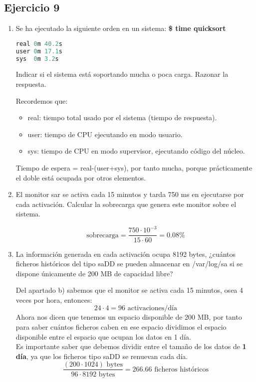 \subsection{Ejercicio 9}
\begin{enumerate}
    \item Se ha ejecutado la siguiente orden en un sistema: \textbf{\$ time quicksort}
\begin{lstlisting}[language=C]
real 0m 40.2s
user 0m 17.1s
sys  0m 3.2s
\end{lstlisting}    
Indicar si el sistema está soportando mucha o poca carga. Razonar la respuesta.
\begin{tcolorbox}[colback=white,colframe=cyan!50!black,fonttitle=\bfseries]
Recordemos que:
\begin{itemize}
    \item real: tiempo total usado por el sistema (tiempo de respuesta).
    \item user: tiempo de CPU ejecutando en modo usuario.
    \item sys: tiempo de CPU en modo supervisor, ejecutando código del núcleo.
\end{itemize}
Tiempo de espera = real-(user+sys), por tanto mucha, porque prácticamente el doble está ocupada por otros elementos.
\end{tcolorbox}
\item El monitor sar se activa cada 15 minutos y tarda 750 ms en ejecutarse por cada activación. Calcular la sobrecarga que genera este monitor sobre el sistema.
\begin{tcolorbox}[colback=white,colframe=cyan!50!black,fonttitle=\bfseries]
\[
\text{sobrecarga}=\dfrac{750\cdot 10^{-3}}{15\cdot 60}=0.08\%
\]
\end{tcolorbox}
\item La información generada en cada activación ocupa 8192 bytes, ¿cuántos ficheros históricos del tipo saDD se pueden almacenar en /var/log/sa si se dispone únicamente de 200 MB de capacidad libre?
\begin{tcolorbox}[colback=white,colframe=cyan!50!black,fonttitle=\bfseries]
Del apartado b) sabemos que el monitor se activa cada 15 minutos, osea 4 veces por hora, entonces:
\[
24\cdot 4=96\text{ activaciones/día}
\]
Ahora nos dicen que tenemos un espacio disponible de 200 MB, por tanto para saber cuántos ficheros caben en ese espacio dividimos el espacio disponible entre el espacio que ocupan los datos en 1 día.\\

Es importante saber que debemos dividir entre el tamaño de los datos de \textbf{1 día}, ya que los ficheros tipo saDD se renuevan cada día.
\[
\dfrac{(200\cdot 1024) \text{ bytes}}{96\cdot 8192\text{ bytes}}=266.66\text{ ficheros históricos}
\]
\end{tcolorbox}
\end{enumerate}
